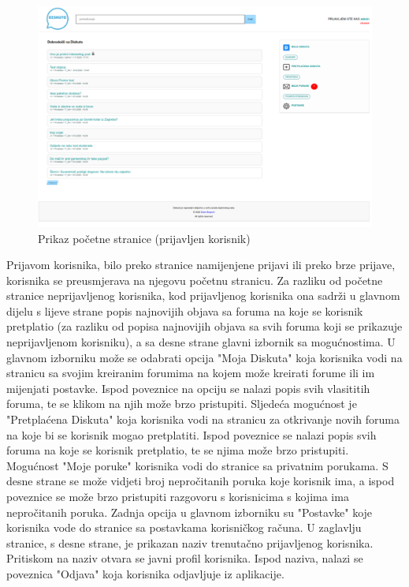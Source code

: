 \documentclass{foi}
\begin{document}
\begin{figure}[h!]
    \centering
    \includegraphics[width=1\textwidth]{slike/pocetna-prijavljen.png}
    \caption{Prikaz početne stranice (prijavljen korisnik)}
\end{figure}

Prijavom korisnika, bilo preko stranice namijenjene prijavi ili preko brze prijave, korisnika se preusmjerava na njegovu početnu stranicu. Za razliku od početne stranice neprijavljenog korisnika, kod prijavljenog korisnika ona sadrži u glavnom dijelu s lijeve strane popis najnovijih objava sa foruma na koje se korisnik pretplatio (za razliku od popisa najnovijih objava sa svih foruma koji se prikazuje neprijavljenom korisniku), a sa desne strane glavni izbornik sa mogućnostima. U glavnom izborniku može se odabrati opcija "Moja Diskuta" koja korisnika vodi na stranicu sa svojim kreiranim forumima na kojem može kreirati forume ili im mijenjati postavke. Ispod poveznice na opciju se nalazi popis svih vlasititih foruma, te se klikom na njih može brzo pristupiti. Sljedeća mogućnost je "Pretplaćena Diskuta" koja korisnika vodi na stranicu za otkrivanje novih foruma na koje bi se korisnik mogao pretplatiti. Ispod poveznice se nalazi popis svih foruma na koje se korisnik pretplatio, te se njima može brzo pristupiti. Mogućnost "Moje poruke" korisnika vodi do stranice sa privatnim porukama. S desne strane se može vidjeti broj nepročitanih poruka koje korisnik ima, a ispod poveznice se može brzo pristupiti razgovoru s korisnicima s kojima ima nepročitanih poruka. Zadnja opcija u glavnom izborniku su "Postavke" koje korisnika vode do stranice sa postavkama korisničkog računa. U zaglavlju stranice, s desne strane, je prikazan naziv trenutačno prijavljenog korisnika. Pritiskom na naziv otvara se javni profil korisnika. Ispod naziva, nalazi se poveznica "Odjava" koja korisnika odjavljuje iz aplikacije.
\end{document}
